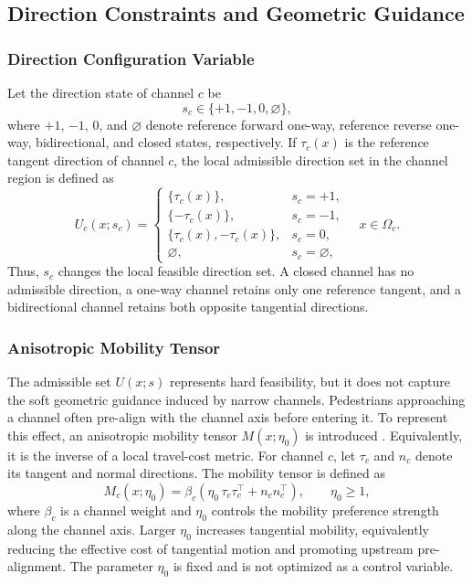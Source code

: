 \documentclass[lettersize,journal]{IEEEtran}
\begin{document}
\subsection{Direction Constraints and Geometric Guidance}

\subsubsection{Direction Configuration Variable}
\label{sec:hjb}

Let the direction state of channel $c$ be
\begin{equation}
s_c \in \{+1,-1,0,\varnothing\},
\label{eq:channel_state}
\end{equation}
where $+1$, $-1$, $0$, and $\varnothing$ denote reference forward one-way, reference reverse one-way, bidirectional, and closed states, respectively.
If $\tau_c(x)$ is the reference tangent direction of channel $c$, the local admissible direction set in the channel region is defined as
\begin{equation}
U_c(x;s_c)=
\begin{cases}
\{\tau_c(x)\}, & s_c=+1,\\
\{-\tau_c(x)\}, & s_c=-1,\\
\{\tau_c(x),-\tau_c(x)\}, & s_c=0,\\
\varnothing, & s_c=\varnothing,
\end{cases}
\quad x\in\Omega_c .
\label{eq:channel_admissible_set}
\end{equation}
Thus, $s_c$ changes the local feasible direction set.
A closed channel has no admissible direction, a one-way channel retains only one reference tangent, and a bidirectional channel retains both opposite tangential directions.

\subsubsection{Anisotropic Mobility Tensor}
\label{sec:guidance}

The admissible set $U(x;s)$ represents hard feasibility, but it does not capture the soft geometric guidance induced by narrow channels.
Pedestrians approaching a channel often pre-align with the channel axis before entering it.
To represent this effect, an anisotropic mobility tensor $M(x;\eta_0)$ is introduced \cite{RN2080,cristiani2016,priuli2015control}.
Equivalently, it is the inverse of a local travel-cost metric.
For channel $c$, let $\tau_c$ and $n_c$ denote its tangent and normal directions.
The mobility tensor is defined as
\begin{equation}
M_c(x;\eta_0)=\beta_c\left(\eta_0\,\tau_c\tau_c^\top+n_c n_c^\top\right),
\qquad \eta_0\ge 1,
\label{eq:mobility_tensor}
\end{equation}
where $\beta_c$ is a channel weight and $\eta_0$ controls the mobility preference strength along the channel axis.
Larger $\eta_0$ increases tangential mobility, equivalently reducing the effective cost of tangential motion and promoting upstream pre-alignment.
The parameter $\eta_0$ is fixed and is not optimized as a control variable.
\end{document}
